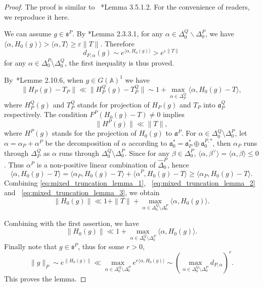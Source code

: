 \documentclass[letterpaper,11pt]{amsart}
\newcommand{\fa}{\mathfrak{a}}
\newcommand{\fs}{\mathfrak{s}}
\newcommand{\bA}{\mathbb{A}}
\newcommand{\<}{\negthickspace}
\theoremstyle{definition}
\theoremstyle{plain}
\theoremstyle{remark}
\numberwithin{equation}{section}
\begin{document}
\begin{proof}
The proof is similar to ~\cite{BPCZ}*{Lemma 3.5.1.2}. For the convenience of
readers, we reproduce it here.

We can assume $g \in \fs^P$. By \cite{BPC22}*{Lemma 2.3.3.1}, for any $\alpha
\in \Delta_0^Q \backslash \Delta_0^P$, we have $\langle \alpha,H_0(g) \rangle
> \langle \alpha,T \rangle \ge \varepsilon \| T \| $. Therefore
    \[
    d_{P,\alpha}(g) \sim e^{\langle \alpha, H_0(g) \rangle}
    > e^{\varepsilon \|T\|}
    \]
for any $\alpha \in \Delta_0^P \setminus \Delta_0^Q$, the first inequality is
thus proved.

By~\cite{LW}*{Lemme 2.10.6}, when $g \in G(\bA)^1$ we have
    \begin{equation} \label{eq:mixed_truncation_lemma_1}
    \| H_P(g)-T_P \| \ll  \| H_P^Q(g)-T_P^Q \|
    \sim 1 + \max_{\alpha \in \Delta_P^Q} \langle \alpha,H_0(g)-T \rangle,
    \end{equation}
where $H_P^Q(g)$ and $T_P^Q$ stands for projection of $H_P(g)$ and $T_P$ into
$\fa_P^Q$ respectively. The condition $F^P(H_0(g)-T) \ne 0$ implies
    \begin{equation} \label{eq:mixed_truncation_lemma_2}
    \| H^P(g) \| \ll \|T\|,
    \end{equation}
where $H^P(g)$ stands for the projection of $H_0(g)$ to $\fa^P$. For $\alpha
\in \Delta_0^Q \setminus \Delta_0^P$, let $\alpha = \alpha_P + \alpha^P$ be
the decomposition of $\alpha$ according to $\fa_0^*= \fa_P^* \oplus \fa_0^{P,*} $, then $\alpha_P$ runs through $\Delta_P^Q$ as $\alpha$ runs through
$\Delta_0^Q \setminus \Delta_0^P$. Since for any $\beta \in \Delta_0^P$,
$\langle \alpha, \beta^\vee \rangle = \langle \alpha,\beta \rangle \le 0$.
Thus $\alpha^P$ is a non-positive linear combination of $\widehat{\Delta}_0^P$,
hence
    \begin{equation} \label{eq:mixed_truncation_lemma_3}
    \langle \alpha , H_0(g)-T \rangle =
    \langle \alpha_P,H_0(g)-T \rangle +
    \langle \alpha^P,H_0(g)-T \rangle \ge
    \langle \alpha_P,H_0(g)-T \rangle.
    \end{equation}
Combining \eqref{eq:mixed_truncation_lemma_1},
~\eqref{eq:mixed_truncation_lemma_2} and
~\eqref{eq:mixed_truncation_lemma_3}, we obtain
    \begin{equation} \label{eq:mixed_truncation_lemma_4}
    \| H_0(g) \| \ll 1 + \|T\| +
    \max_{\alpha \in \Delta_0^Q \setminus \Delta_0^P}
    \langle \alpha, H_0(g) \rangle.
    \end{equation}

Combining with the first assertion, we have
    \[
    \| H_0(g) \| \ll 1 + \max_{\alpha \in \Delta_0^Q \setminus \Delta_0^P}
    \langle \alpha, H_0(g) \rangle.
    \]
Finally note that $g \in \fs^P$, thus for some $r>0$,
    \[
    \| g \|_P \sim e^{\| H_0(g) \|} \ll
    \max_{\alpha \in \Delta_0^Q \setminus \Delta_0^P}
    e^{r\langle \alpha, H_0(g) \rangle} \sim
    \left( \max_{\alpha \in \Delta_0^Q \setminus \Delta_0^P} d_{P,\alpha}
    \right)^r.
    \]
This proves the lemma.
\end{proof}
\end{document}
